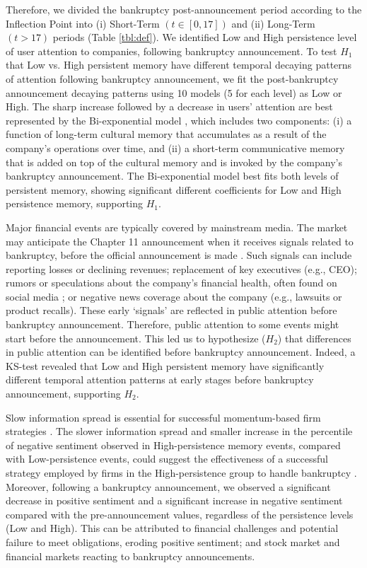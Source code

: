 \documentclass[9pt,twocolumn,twoside,lineno]{pnas-new}
\begin{document}
Therefore, we divided the bankruptcy post-announcement period according to the Inflection Point into (i) Short-Term $(t \in [0, 17])$ and (ii) Long-Term $(t > 17)$ periods (Table \ref{tbl:def}).
We identified Low and High persistence level of user attention to companies, following bankruptcy announcement.
To test $H_1$ that Low vs. High persistent memory have different temporal decaying patterns of attention following bankruptcy announcement, we fit the post-bankruptcy announcement decaying patterns using 10 models (5 for each level) as Low or High.
The sharp increase followed by a decrease in users' attention are best represented by the Bi-exponential model \cite{candia2019universal}, which includes two components: 
(i) a function of long-term cultural memory that accumulates as a result of the company's operations over time, and 
(ii) a short-term communicative memory that is added on top of the cultural memory and is invoked by the company's bankruptcy announcement.
The Bi-exponential model best fits both levels of persistent memory, showing significant different coefficients for Low and High persistence memory, supporting $H_1$.

Major financial events are typically covered by mainstream media.
The market may anticipate the Chapter 11 announcement when it receives signals related to bankruptcy, before the official announcement is made \cite{coelho2015bad}.
Such signals can include reporting losses or declining revenues; replacement of key executives (e.g., CEO); rumors or speculations about the company's financial health, often found on social media \cite{xing2018intelligent,khan2020stock}; or negative news coverage about the company (e.g., lawsuits or product recalls).
These early `signals' are reflected in public attention before bankruptcy announcement.
Therefore, public attention to some events might start before the  announcement.
This led us to hypothesize ($H_2$) that differences in public attention can be identified before bankruptcy announcement.
Indeed, a KS-test revealed that Low and High persistent memory have significantly different temporal attention patterns at early stages before bankruptcy announcement, supporting $H_2$.

Slow information spread is essential for successful momentum-based firm strategies \cite{hong2000bad, doukas2005european}.
The slower information spread and smaller increase in the percentile of negative sentiment observed in High-persistence memory events, compared with Low-persistence events, could suggest the effectiveness of a successful strategy employed by firms in the High-persistence group to handle bankruptcy \cite{setiowati2022public}.
Moreover, following a bankruptcy announcement, we observed a significant decrease in positive sentiment and a significant increase in negative sentiment compared with the pre-announcement values, regardless of the persistence levels (Low and High).
This can be attributed to financial challenges and potential failure to meet obligations, eroding positive sentiment; and stock market and financial markets reacting to bankruptcy announcements. 
\end{document}
